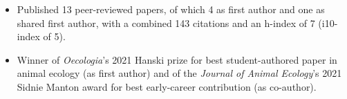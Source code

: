 


\begin{itemize}
  \item Published 13 peer-reviewed papers, of which 4 as first author and one as shared first author, with a combined 143 citations and an h-index of 7 (i10-index of 5).
  \item Winner of \textit{Oecologia}'s 2021 Hanski prize for best student-authored paper in animal ecology (as first author) and of the \textit{Journal of Animal Ecology}'s 2021 Sidnie Manton award for best early-career contribution (as co-author).
\end{itemize}